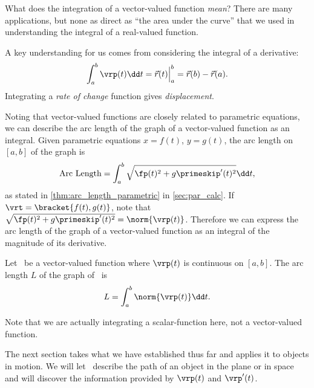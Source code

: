 What does the integration of a vector-valued function \emph{mean}? There are many applications, but none as direct as ``the area under the curve'' that we used in understanding the integral of a real-valued function.

A key understanding for us comes from considering the integral of a derivative: \[\int_a^b \vrp(t)\dd t = \vec r(t)\Big|_a^b = \vec r(b)-\vec r(a).\]
Integrating a \emph{rate of change} function gives \emph{displacement}.

Noting that vector-valued functions are closely related to parametric equations, we can describe the arc length of the graph of a vector-valued function as an integral. Given parametric equations $x=f(t)$, $y=g(t)$, the arc length on $[a,b]$ of the graph is
\[\text{Arc Length} = \int_a^b\sqrt{\fp(t)^2+g\primeskip'(t)^2}\dd t,\]
as stated in \autoref{thm:arc_length_parametric} in \autoref{sec:par_calc}. If $\vrt =\bracket{f(t), g(t)}$, note that $\sqrt{\fp(t)^2+g\primeskip'(t)^2} = \norm{\vrp(t)}$. Therefore we can express the arc length of the graph of a vector-valued function as an integral of the magnitude of its derivative.

\begin{theorem}\label{thm:vvf_arc_length}%
Let \vrt\ be a vector-valued function where $\vrp(t)$ is continuous on $[a,b]$. The arc length $L$ of the graph of \vrt\ is 
\[L = \int_a^b \norm{\vrp(t)}\dd t.\]
\end{theorem}

Note that we are actually integrating a scalar-function here, not a vector-valued function.

The next section takes what we have established thus far and applies it to objects in motion. We will let \vrt\ describe the path of an object in the plane or in space and will discover the information provided by $\vrp(t)$ and $\vrp'(t)$.

